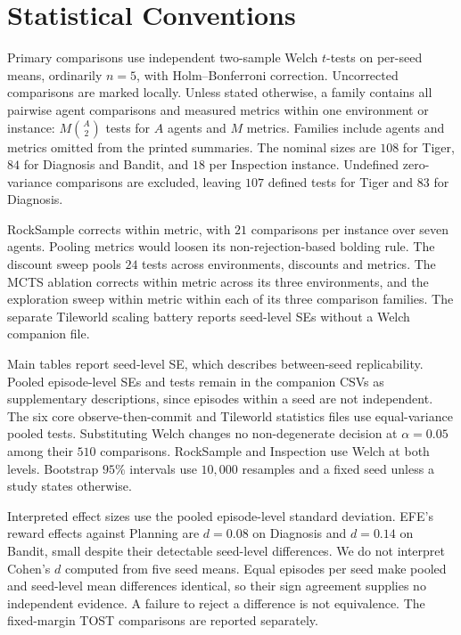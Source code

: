 \FloatBarrier

\section{Statistical Conventions}
\label{app:stats}

Primary comparisons use independent two-sample Welch $t$-tests on per-seed means, ordinarily $n=5$, with Holm--Bonferroni correction. Uncorrected comparisons are marked locally. Unless stated otherwise, a family contains all pairwise agent comparisons and measured metrics within one environment or instance: $M\binom{A}{2}$ tests for $A$ agents and $M$ metrics. Families include agents and metrics omitted from the printed summaries. The nominal sizes are $108$ for Tiger, $84$ for Diagnosis and Bandit, and $18$ per Inspection instance. Undefined zero-variance comparisons are excluded, leaving $107$ defined tests for Tiger and $83$ for Diagnosis.

RockSample corrects within metric, with $21$ comparisons per instance over seven agents. Pooling metrics would loosen its non-rejection-based bolding rule. The discount sweep pools $24$ tests across environments, discounts and metrics. The MCTS ablation corrects within metric across its three environments, and the exploration sweep within metric within each of its three comparison families. The separate Tileworld scaling battery reports seed-level SEs without a Welch companion file.

Main tables report seed-level SE, which describes between-seed replicability. Pooled episode-level SEs and tests remain in the companion CSVs as supplementary descriptions, since episodes within a seed are not independent. The six core observe-then-commit and Tileworld statistics files use equal-variance pooled tests. Substituting Welch changes no non-degenerate decision at $\alpha=0.05$ among their $510$ comparisons. RockSample and Inspection use Welch at both levels. Bootstrap $95\%$ intervals use $10{,}000$ resamples and a fixed seed unless a study states otherwise.

Interpreted effect sizes use the pooled episode-level standard deviation. EFE's reward effects against Planning are $d=0.08$ on Diagnosis and $d=0.14$ on Bandit, small despite their detectable seed-level differences. We do not interpret Cohen's $d$ computed from five seed means. Equal episodes per seed make pooled and seed-level mean differences identical, so their sign agreement supplies no independent evidence. A failure to reject a difference is not equivalence. The fixed-margin TOST comparisons are reported separately.


